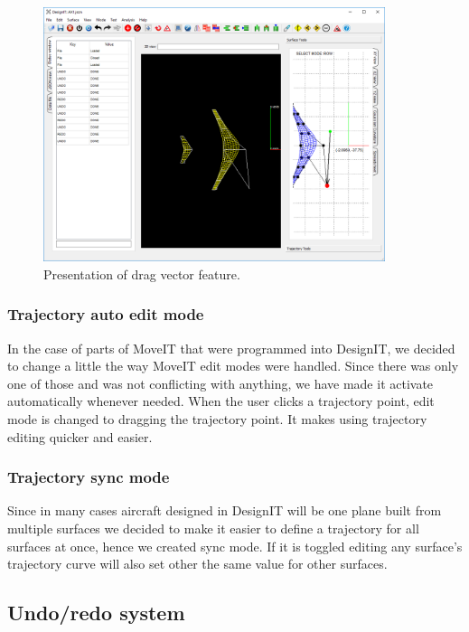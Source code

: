\documentclass[a4paper, 11pt, article]{report}
\begin{document}
\begin{figure}[!h]
	\centering
	
	\includegraphics[width=10cm]{images/drag_vector.png}
	
	\caption{Presentation of drag vector feature.}
	
	\label{dragVector}
\end{figure}

\subsubsection{Trajectory auto edit mode}

In the case of parts of MoveIT that were programmed into DesignIT, we decided to change a little the way MoveIT edit modes were handled. Since there was only one of those and was not conflicting with anything, we have made it activate automatically whenever needed. When the user clicks a trajectory point, edit mode is changed to dragging the trajectory point. It makes using trajectory editing quicker and easier.

\subsubsection{Trajectory sync mode}

Since in many cases aircraft designed in DesignIT will be one plane built from multiple surfaces we decided to make it easier to define a trajectory for all surfaces at once, hence we created sync mode. If it is toggled editing any surface's trajectory curve will also set other the same value for other surfaces.

\subsection{Undo/redo system}
\end{document}

